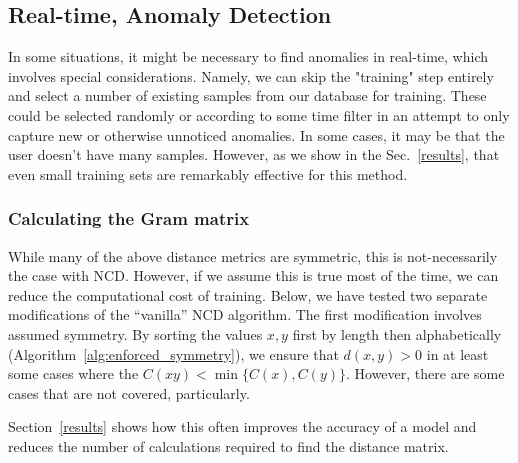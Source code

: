 \documentclass[conference]{IEEEtran}
\begin{document}
\subsection{Real-time, Anomaly Detection}
In some situations, it might be necessary to find anomalies in real-time, which involves special considerations. Namely, we can skip the "training" step entirely and select a number of existing samples from our database for training. These could be selected randomly or according to some time filter in an attempt to only capture new or otherwise unnoticed anomalies. In some cases, it may be that the user doesn't have many samples. However, as we show in the Sec.~\ref{results}, that even small training sets are remarkably effective for this method.




\subsubsection{Calculating the Gram matrix}
\label{symmetry}
While many of the above distance metrics are symmetric, this is not-necessarily the case with NCD. 
However, if we assume this is true most of the time, we can reduce the computational cost of training. Below, we have tested two separate modifications of the ``vanilla'' NCD algorithm. 
The first modification involves assumed symmetry. 
By sorting the values $x,y$ first by length then alphabetically (Algorithm~\ref{alg:enforced_symmetry}), we ensure that $d(x,y) > 0$ in at least some cases where the $ C(xy) < \min\{C(x),C(y)\}$. However, there are some cases that are not covered, particularly.

Section~\ref{results} shows how this often improves the accuracy of a model and reduces the number of calculations required to find the distance matrix.
\end{document}
